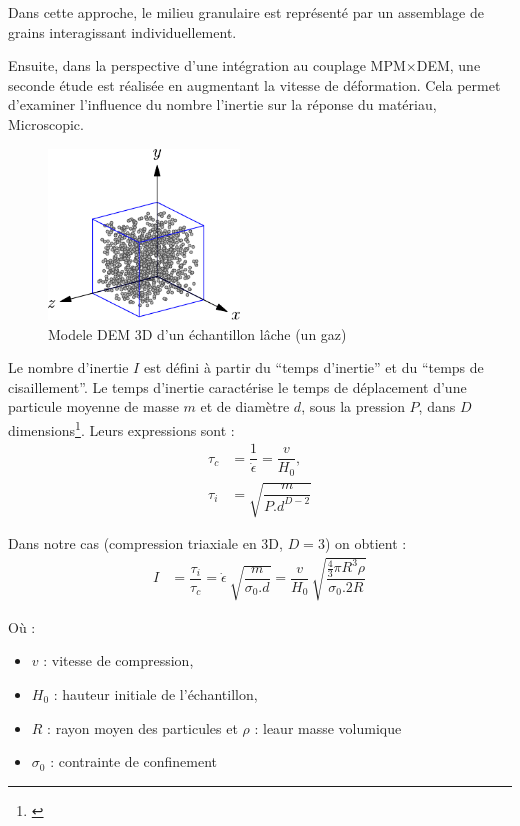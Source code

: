\documentclass[5p,authoryear,square]{elsarticle}
\begin{document}
Dans cette approche, le milieu granulaire est représenté par un assemblage de grains interagissant individuellement.

    Ensuite, dans la perspective d'une intégration au couplage MPM$\times$DEM, une seconde étude est réalisée en augmentant la vitesse de déformation. Cela permet d'examiner l'influence du nombre l'inertie sur la réponse du matériau,
Microscopic.
\begin{figure}[h] \centering
	\includegraphics[width=2in]{figures/modele.pdf}
	\caption[]{Modele DEM 3D d'un échantillon lâche (un gaz)}
	\label{echantillon} 
\end{figure}

    Le nombre d'inertie $I$ est défini à partir du ``temps d'inertie'' et du ``temps de cisaillement''.
    Le temps d'inertie caractérise le temps de déplacement d'une particule moyenne de masse $m$ et de diamètre $d$, sous la pression $P$, dans $D$ dimensions\footnote{\citep{combe2023demlecture}}. Leurs expressions sont :
    \begin{align}
        	\tau_c &= \dfrac{1}{\dot{\epsilon}} = \dfrac{v}{H_0}, \\
        	\tau_i &= \sqrt{\dfrac{m}{P.d^{D-2}}}
    \end{align}

    Dans notre cas (compression triaxiale en 3D, $D=3$) on obtient :
    \begin{align}
        I &= \dfrac{\tau_i}{\tau_c}
        = \dot{\epsilon}\ \sqrt{\dfrac{m}{\sigma_0.d}}
        = \dfrac{v}{H_0}\,\sqrt{\dfrac{\tfrac{4}{3}\pi R^3 \rho}{\sigma_{0}.2R}}
    \end{align}

    Où :
    \begin{itemize}
        \item $v$ : vitesse de compression,
        \item $H_0$ : hauteur initiale de l'échantillon,
        \item $R$ : rayon moyen des particules et $\rho$ : leaur masse volumique 
        \item $\sigma_{0}$ : contrainte de confinement
    \end{itemize}
\end{document}
